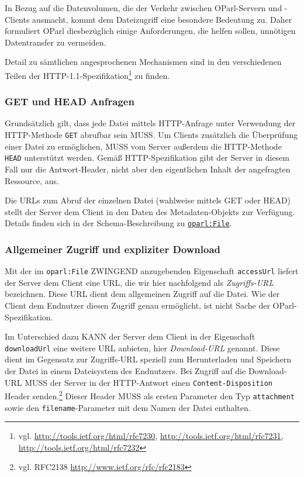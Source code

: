 \documentclass[,a4paper]{article}
\begin{document}
In Bezug auf die Datenvolumen, die der Verkehr zwischen OParl-Servern
und -Clients ausmacht, kommt dem Dateizugriff eine besondere Bedeutung
zu. Daher formuliert OParl diesbezüglich einige Anforderungen, die
helfen sollen, unnötigen Datentransfer zu vermeiden.

Detail zu sämtlichen angesprochenen Mechanismen sind in den
verschiedenen Teilen der HTTP-1.1-Spezifikation\footnote{vgl.
  \url{http://tools.ietf.org/html/rfc7230},
  \url{http://tools.ietf.org/html/rfc7231},
  \url{http://tools.ietf.org/html/rfc7232}} zu finden.

\subsubsection{GET und HEAD Anfragen}\label{get-und-head-anfragen}

Grundsätzlich gilt, dass jede Datei mittels HTTP-Anfrage unter
Verwendung der HTTP-Methode \texttt{GET} abrufbar sein MUSS. Um Clients
zusätzlich die Überprüfung einer Datei zu ermöglichen, MUSS vom Server
außerdem die HTTP-Methode \texttt{HEAD} unterstützt werden. Gemäß
HTTP-Spezifikation gibt der Server in diesem Fall nur die
Antwort-Header, nicht aber den eigentlichen Inhalt der angefragten
Ressource, aus.

Die URLs zum Abruf der einzelnen Datei (wahlweise mittels GET oder HEAD)
stellt der Server dem Client in den Daten des Metadaten-Objekts zur
Verfügung. Details finden sich in der Schema-Beschreibung zu
\hyperref[oparlux5ffile]{\texttt{oparl:File}}.

\subsubsection{Allgemeiner Zugriff und expliziter
Download}\label{allgemeiner-zugriff-und-expliziter-download}

Mit der im \texttt{oparl:File} ZWINGEND anzugebenden Eigenschaft
\texttt{accessUrl} liefert der Server dem Client eine URL, die wir hier
nachfolgend als \emph{Zugriffs-URL} bezeichnen. Diese URL dient dem
allgemeinen Zugriff auf die Datei. Wie der Client dem Endnutzer diesen
Zugriff genau ermöglicht, ist nicht Sache der OParl-Spezifikation.

Im Unterschied dazu KANN der Server dem Client in der Eigenschaft
\texttt{downloadUrl} eine weitere URL anbieten, hier \emph{Download-URL}
genannt. Diese dient im Gegensatz zur Zugriffs-URL speziell zum
Herunterladen und Speichern der Datei in einem Dateisystem des
Endnutzers. Bei Zugriff auf die Download-URL MUSS der Server in der
HTTP-Antwort einen \texttt{Content-Disposition} Header senden.\footnote{vgl.
  RFC2138 \url{http://www.ietf.org/rfc/rfc2183}} Dieser Header MUSS als
ersten Parameter den Typ \texttt{attachment} sowie den
\texttt{filename}-Parameter mit dem Namen der Datei enthalten.
\end{document}

